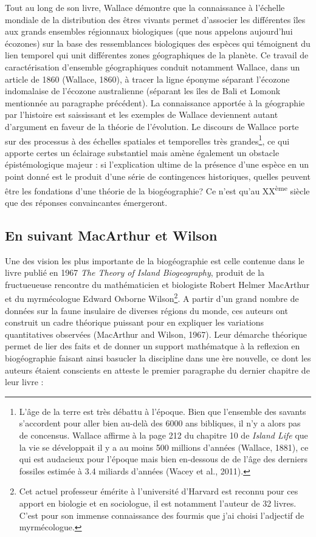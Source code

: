 Tout au long de son livre, Wallace démontre que la connaissance à
l'échelle mondiale de la distribution des êtres vivants permet
d'associer les différentes îles aux grands ensembles régionnaux
biologiques (que nous appelons aujourd'hui écozones) sur la base des
ressemblances biologiques des espèces qui témoignent du lien temporel
qui unit différentes zones géographiques de la planète. Ce travail de
caractérisation d'ensemble géographiques conduit notamment Wallace, dans
un article de 1860 (Wallace, 1860), à tracer la ligne éponyme séparant
l'écozone indomalaise de l'écozone australienne (séparant les îles de
Bali et Lomonk mentionnée au paragraphe précédent). La connaissance
apportée à la géographie par l'histoire est saississant et les exemples
de Wallace deviennent autant d'argument en faveur de la théorie de
l'évolution. Le discours de Wallace porte sur des processus à des
échelles spatiales et temporelles très grandes\footnote{L'âge de la
  terre est très débattu à l'époque. Bien que l'ensemble des savants
  s'accordent pour aller bien au-delà des 6000 ans bibliques, il n'y a
  alors pas de concensus. Wallace affirme à la page 212 du chapitre 10
  de \emph{Island Life} que la vie se développait il y a au moins 500
  millions d'années (Wallace, 1881), ce qui est audacieux pour l'époque
  mais bien en-dessous de de l'âge des derniers fossiles estimée à 3.4
  miliards d'années (Wacey et al., 2011).}, ce qui apporte certes un
éclairage substantiel mais amène également un obstacle épistémologique
majeur : si l'explication ultime de la présence d'une espèce en un point
donné est le produit d'une série de contingences historiques, quelles
peuvent être les fondations d'une théorie de la biogéographie? Ce n'est
qu'au XX\textsuperscript{ème} siècle que des réponses convaincantes
émergeront.

\subsection*{En suivant MacArthur et
Wilson}\label{en-suivant-macarthur-et-wilson}

Une des vision les plus importante de la biogéographie est celle
contenue dans le livre publié en 1967 \emph{The Theory of Island
Biogeography}, produit de la fructueueuse rencontre du mathématicien et
biologiste Robert Helmer MacArthur et du myrmécologue Edward Osborne
Wilson\footnote{Cet actuel professeur émérite à l'université d'Harvard
  est reconnu pour ces apport en biologie et en sociologue, il est
  notamment l'auteur de 32 livres. C'est pour son immense connaissance
  des fourmis que j'ai choisi l'adjectif de myrmécologue.}. A partir
d'un grand nombre de données sur la faune insulaire de diverses régions
du monde, ces auteurs ont construit un cadre théorique puissant pour en
expliquer les variations quantitatives observées (MacArthur and Wilson,
1967). Leur démarche théorique permet de lier des faits et de donner un
support mathématque à la reflexion en biogéographie faisant ainsi
basucler la discipline dans une ère nouvelle, ce dont les auteurs
étaient conscients en atteste le premier paragraphe du dernier chapitre
de leur livre :

